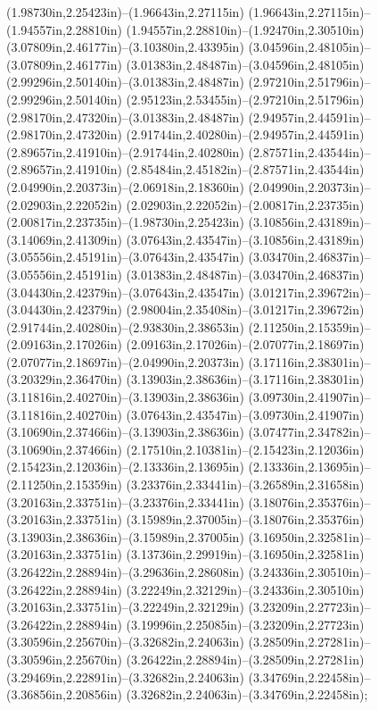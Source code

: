 (1.98730in,2.25423in)--(1.96643in,2.27115in) (1.96643in,2.27115in)--(1.94557in,2.28810in) (1.94557in,2.28810in)--(1.92470in,2.30510in) (3.07809in,2.46177in)--(3.10380in,2.43395in) (3.04596in,2.48105in)--(3.07809in,2.46177in) (3.01383in,2.48487in)--(3.04596in,2.48105in) (2.99296in,2.50140in)--(3.01383in,2.48487in) (2.97210in,2.51796in)--(2.99296in,2.50140in) (2.95123in,2.53455in)--(2.97210in,2.51796in) (2.98170in,2.47320in)--(3.01383in,2.48487in) (2.94957in,2.44591in)--(2.98170in,2.47320in) (2.91744in,2.40280in)--(2.94957in,2.44591in) (2.89657in,2.41910in)--(2.91744in,2.40280in) (2.87571in,2.43544in)--(2.89657in,2.41910in) (2.85484in,2.45182in)--(2.87571in,2.43544in) (2.04990in,2.20373in)--(2.06918in,2.18360in) (2.04990in,2.20373in)--(2.02903in,2.22052in) (2.02903in,2.22052in)--(2.00817in,2.23735in) (2.00817in,2.23735in)--(1.98730in,2.25423in) (3.10856in,2.43189in)--(3.14069in,2.41309in) (3.07643in,2.43547in)--(3.10856in,2.43189in) (3.05556in,2.45191in)--(3.07643in,2.43547in) (3.03470in,2.46837in)--(3.05556in,2.45191in) (3.01383in,2.48487in)--(3.03470in,2.46837in) (3.04430in,2.42379in)--(3.07643in,2.43547in) (3.01217in,2.39672in)--(3.04430in,2.42379in) (2.98004in,2.35408in)--(3.01217in,2.39672in) (2.91744in,2.40280in)--(2.93830in,2.38653in) (2.11250in,2.15359in)--(2.09163in,2.17026in) (2.09163in,2.17026in)--(2.07077in,2.18697in) (2.07077in,2.18697in)--(2.04990in,2.20373in) (3.17116in,2.38301in)--(3.20329in,2.36470in) (3.13903in,2.38636in)--(3.17116in,2.38301in) (3.11816in,2.40270in)--(3.13903in,2.38636in) (3.09730in,2.41907in)--(3.11816in,2.40270in) (3.07643in,2.43547in)--(3.09730in,2.41907in) (3.10690in,2.37466in)--(3.13903in,2.38636in) (3.07477in,2.34782in)--(3.10690in,2.37466in) (2.17510in,2.10381in)--(2.15423in,2.12036in) (2.15423in,2.12036in)--(2.13336in,2.13695in) (2.13336in,2.13695in)--(2.11250in,2.15359in) (3.23376in,2.33441in)--(3.26589in,2.31658in) (3.20163in,2.33751in)--(3.23376in,2.33441in) (3.18076in,2.35376in)--(3.20163in,2.33751in) (3.15989in,2.37005in)--(3.18076in,2.35376in) (3.13903in,2.38636in)--(3.15989in,2.37005in) (3.16950in,2.32581in)--(3.20163in,2.33751in) (3.13736in,2.29919in)--(3.16950in,2.32581in) (3.26422in,2.28894in)--(3.29636in,2.28608in) (3.24336in,2.30510in)--(3.26422in,2.28894in) (3.22249in,2.32129in)--(3.24336in,2.30510in) (3.20163in,2.33751in)--(3.22249in,2.32129in) (3.23209in,2.27723in)--(3.26422in,2.28894in) (3.19996in,2.25085in)--(3.23209in,2.27723in) (3.30596in,2.25670in)--(3.32682in,2.24063in) (3.28509in,2.27281in)--(3.30596in,2.25670in) (3.26422in,2.28894in)--(3.28509in,2.27281in) (3.29469in,2.22891in)--(3.32682in,2.24063in) (3.34769in,2.22458in)--(3.36856in,2.20856in) (3.32682in,2.24063in)--(3.34769in,2.22458in);
